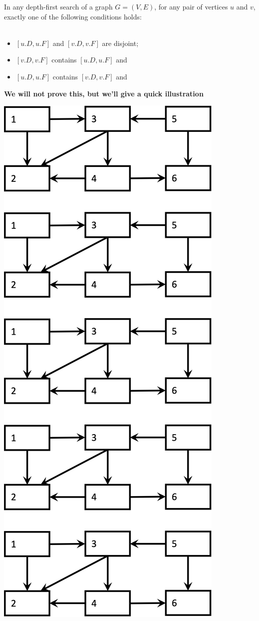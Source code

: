 \documentclass[11  pt]{exam}
\begin{document}
	\begin{theorem}
		In any depth-first search of a graph $G = (V,E)$, for any pair of vertices $u$ and $v$, exactly one of the following conditions holds:\\ \\
		\begin{itemize}
			\item $[u.D,u.F]$ and $[v.D, v.F]$ are disjoint;  \\
			\item $[v.D, v.F]$ contains $[u.D,u.F]$ and  \\
			\item $[u.D,u.F]$ contains $[v.D, v.F]$ and 
		\end{itemize}
	\end{theorem}
	
	
	\textbf{We will not prove this, but we'll give a quick illustration}\\
	
		\begin{center}
	\includegraphics[width = .4\linewidth]{dfs.png}
\end{center}
\end{document}
